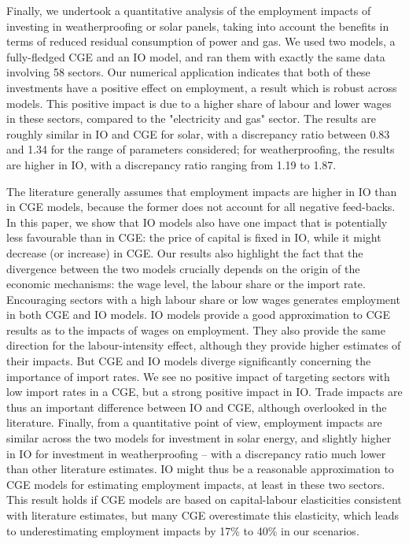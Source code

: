 Finally, we undertook a quantitative analysis of the employment impacts of investing in weatherproofing or  solar panels, taking into account the benefits in terms of reduced residual consumption of power and gas. We used two models, a fully-fledged CGE and an IO model, and ran them with exactly the same data involving 58 sectors.  
Our numerical application indicates that both of these investments have a positive effect on employment, a result which is robust across models. This positive impact is due to a higher share of labour and lower wages in these sectors, compared to the "electricity and gas" sector. The results are roughly similar in IO and CGE for solar, with a discrepancy ratio between 0.83 and 1.34 for the range of parameters considered; for weatherproofing, the results are higher in IO, with a discrepancy ratio ranging from 1.19 to 1.87.

The literature generally assumes that employment impacts are higher in IO than in CGE models, because the former does not account for all negative feed-backs. In this paper, we show that IO models also have one impact that is potentially less favourable than in CGE: the price of capital is fixed in IO, while it might decrease (or increase) in CGE.
Our results also highlight the fact that the divergence between the two models crucially depends on the origin of the economic mechanisms: the wage level, the labour share or the import rate.
Encouraging sectors with a high labour share or low wages generates employment in both CGE and IO models. IO models provide a good approximation to CGE results as to the impacts of wages on employment. They also provide the same direction for the labour-intensity effect, although they provide higher estimates of their impacts. 
But CGE and IO models diverge significantly concerning the importance of import rates. We see no positive impact of targeting sectors with low import rates in a CGE, but a strong positive impact in IO. Trade impacts are thus an important difference between IO and CGE, although overlooked in the literature.
Finally, from a quantitative point of view, employment impacts are similar across the two models for investment in solar energy, and slightly higher in IO for investment in weatherproofing -- with a discrepancy ratio much lower than other literature estimates. IO might thus be a reasonable approximation to CGE models for estimating employment impacts, at least in these two sectors. This result holds if CGE models are based on capital-labour elasticities consistent with literature estimates, but many CGE overestimate this elasticity, which leads to underestimating employment impacts by 17\% to 40\% in our scenarios. 


